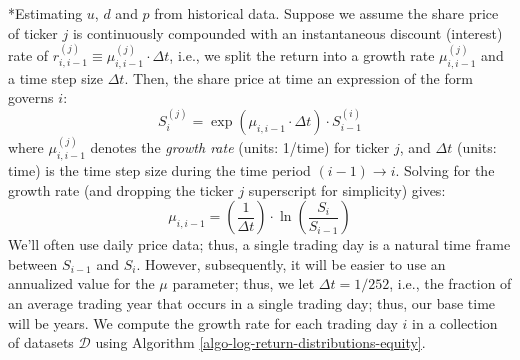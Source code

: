 \documentclass[11pt]{article}
\makeatletter
\theoremstyle{definition}
\renewcommand\subsubsection{\@startsection
	{subsubsection}{2}{0mm}
	{-0.05in}
	{-0.5\baselineskip}
	{\normalfont\normalsize\itshape\bfseries}}
\makeatother
\begin{document}
\subsubsection*{Estimating $u$, $d$ and $p$ from historical data.}
Suppose we assume the share price of ticker $j$ is continuously compounded with an instantaneous discount (interest) rate of 
$r^{(j)}_{i,i-1}\equiv\mu^{(j)}_{i,i-1}\cdot\Delta{t}$, i.e., we split the return into a growth rate $\mu^{(j)}_{i,i-1}$ and a time step size $\Delta{t}$.
Then, the share price at time an expression of the form governs $i$:
\begin{equation}\label{eqn:share-price-growth-rate}
S^{(j)}_{i} = \exp\left(\mu_{i,i-1}\cdot\Delta{t}\right)\cdot{S^{(i)}_{i-1}}
\end{equation}
where $\mu^{(j)}_{i,i-1}$ denotes the \textit{growth rate} (units: 1/time) for ticker $j$, and $\Delta{t}$ (units: time) 
is the time step size during the time period $(i-1)\rightarrow{i}$.
Solving for the growth rate (and dropping the ticker $j$ superscript for simplicity) gives:
\begin{equation}
\mu_{i,i-1} = \left(\frac{1}{\Delta{t}}\right)\cdot\ln\left(\frac{S_{i}}{S_{i-1}}\right)
\end{equation}
We'll often use daily price data; thus, a single trading day is a natural time frame between $S_{i-1}$ and $S_{i}$. 
However, subsequently, it will be easier to use an annualized value for the $\mu$ parameter; thus, we let $\Delta{t} = 1/252$, 
i.e., the fraction of an average trading year that occurs in a single trading day; thus, our base time will be years.
We compute the growth rate for each trading day $i$ in a collection of datasets $\mathcal{D}$ using Algorithm \ref{algo-log-return-distributions-equity}.
\end{document}
